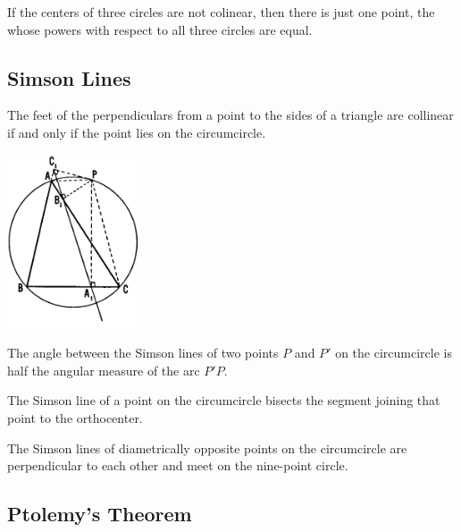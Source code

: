 \documentclass[DIV=12, a4]{scrartcl}
\begin{document}
\begin{theorem}
	If the centers of three circles are not colinear, then there is just one point, the  whose powers with respect to all three circles are equal.
\end{theorem}

\subsection{Simson Lines}


\begin{theorem}
	The feet of the perpendiculars from a point to the sides of a triangle are collinear if and only if the point lies on the circumcircle.
\end{theorem}

 \begin{center}
		\includegraphics[width=0.3\textwidth]{media/2-5A}
\end{center}

\begin{theorem}
	The angle between the Simson lines of two points $P$ and $P'$ on the circumcircle is half the angular measure of the arc $P' P$. 
\end{theorem}

\begin{theorem}
	The Simson line of a point on the circumcircle bisects the segment joining that point to the orthocenter.
\end{theorem}

\begin{lemma}
The Simson lines of diametrically opposite points on the circumcircle are perpendicular to each other and meet on the nine-point circle.
\end{lemma}



\subsection{Ptolemy's Theorem}
\end{document}
